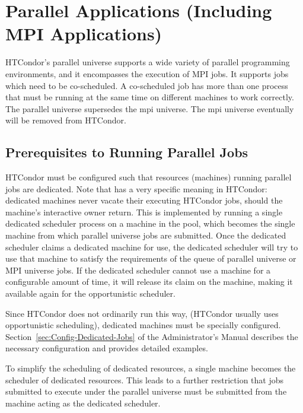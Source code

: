 \section{\label{sec:Parallel}Parallel Applications (Including MPI Applications)}

HTCondor's parallel universe supports a wide variety of parallel
programming environments, and it encompasses the execution 
of MPI jobs.
It supports jobs which need to be co-scheduled.
A co-scheduled job has
more than one process that must be running at the same time on different
machines to work correctly.
The parallel universe supersedes the mpi universe.
The mpi universe eventually will be removed from HTCondor.


\subsection{\label{sec:parallel-setup}Prerequisites to Running Parallel Jobs}

HTCondor must be configured such that resources (machines) running
parallel jobs are dedicated.  
Note that  has a very specific meaning in HTCondor:
dedicated
machines never vacate their executing HTCondor jobs,
should the machine's interactive owner return.
This is implemented by running a single dedicated scheduler
process on a machine in the pool,
which becomes the single machine from which parallel universe
jobs are submitted.
Once the dedicated scheduler claims a
dedicated machine for use, 
the dedicated scheduler will try to use that machine to satisfy
the requirements of the queue of parallel universe or MPI universe jobs.
If the dedicated scheduler cannot use a machine for a
configurable amount of time, it will release its claim on the machine,
making it available again for the opportunistic scheduler.

Since HTCondor does not ordinarily run this way, (HTCondor usually uses
opportunistic scheduling), dedicated machines must be specially
configured.  Section~\ref{sec:Config-Dedicated-Jobs} of the
Administrator's Manual describes the necessary configuration and
provides detailed examples.

To simplify the scheduling of dedicated resources, a single machine
becomes the scheduler of dedicated resources.  This leads to a further
restriction that jobs submitted to execute under the parallel universe
must be submitted from the machine acting as the dedicated scheduler.

